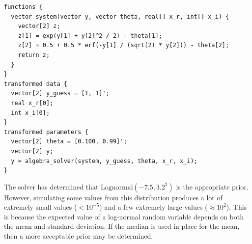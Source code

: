\documentclass[11pt, oneside, openany]{scrbook}
\newenvironment{Shaded}{\begin{snugshade}}{\end{snugshade}}
\newcommand{\CommentTok}[1]{\textcolor[rgb]{0.56,0.35,0.01}{\textit{#1}}}
\newcommand{\DataTypeTok}[1]{\textcolor[rgb]{0.13,0.29,0.53}{#1}}
\newcommand{\DecValTok}[1]{\textcolor[rgb]{0.00,0.00,0.81}{#1}}
\newcommand{\KeywordTok}[1]{\textcolor[rgb]{0.13,0.29,0.53}{\textbf{#1}}}
\newcommand{\NormalTok}[1]{#1}
\newcommand{\OperatorTok}[1]{\textcolor[rgb]{0.81,0.36,0.00}{\textbf{#1}}}
\newcommand{\StringTok}[1]{\textcolor[rgb]{0.31,0.60,0.02}{#1}}
\begin{document}
\begin{verbatim}
functions {
  vector system(vector y, vector theta, real[] x_r, int[] x_i) {
    vector[2] z;
    z[1] = exp(y[1] + y[2]^2 / 2) - theta[1];
    z[2] = 0.5 + 0.5 * erf(-y[1] / (sqrt(2) * y[2])) - theta[2];
    return z;
  }
}
transformed data {
  vector[2] y_guess = [1, 1]';
  real x_r[0];
  int x_i[0];
}
transformed parameters {
  vector[2] theta = [0.100, 0.99]';
  vector[2] y;
  y = algebra_solver(system, y_guess, theta, x_r, x_i);
}
\end{verbatim}



\begin{Shaded}
\end{Shaded}


The solver has determined that \(\mathrm{Lognormal}(-7.5, 3.2^2)\) is the appropriate prior. However, simulating some values from this distribution produces a lot of extremely small values (\(<10^{-5}\)) and a few extremely large values (\(\approx 10^2\)). This is because the expected value of a log-normal random variable depends on both the mean and standard deviation. If the median is used in place for the mean, then a more acceptable prior may be determined.


\begin{Shaded}
\end{Shaded}
\end{document}
